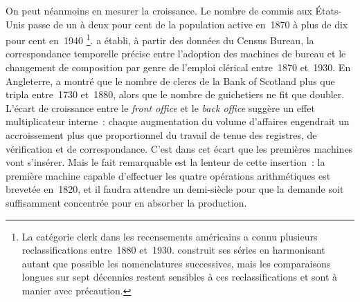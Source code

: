 On peut néanmoins en mesurer la croissance. Le nombre de commis aux États-Unis passe de un à deux pour cent de la population active en~1870 à plus de dix pour cent en~1940 \parencite{cortada_before_1993}\footnote{La catégorie \og clerk\fg{} dans les recensements américains a connu plusieurs reclassifications entre~1880 et~1930. \textcite{cortada_before_1993} construit ses séries en harmonisant autant que possible les nomenclatures successives, mais les comparaisons longues sur sept décennies restent sensibles à ces reclassifications et sont à manier avec précaution.}. \textcite{rotella_transformation_1981} a établi, à partir des données du Census Bureau, la correspondance temporelle précise entre l'adoption des machines de bureau et le changement de composition par genre de l'emploi clérical entre~1870 et~1930. En Angleterre, \textcite{boot_salaries_1991} a montré que le nombre de clercs de la Bank of Scotland plus que tripla entre~1730 et~1880, alors que le nombre de guichetiers ne fit que doubler. %
L'écart de croissance entre le \og \emph{front office}\fg{} et le \og \emph{back office}\fg{} suggère un effet multiplicateur interne~: chaque augmentation du volume d'affaires engendrait un accroissement plus que proportionnel du travail de tenue des registres, de vérification et de correspondance. C'est dans cet écart que les premières machines vont s'insérer. Mais le fait remarquable est la lenteur de cette insertion~: la première machine capable d'effectuer les quatre opérations arithmétiques est brevetée en~1820, et il faudra attendre un demi-siècle pour que la demande soit suffisamment concentrée pour en absorber la production.



